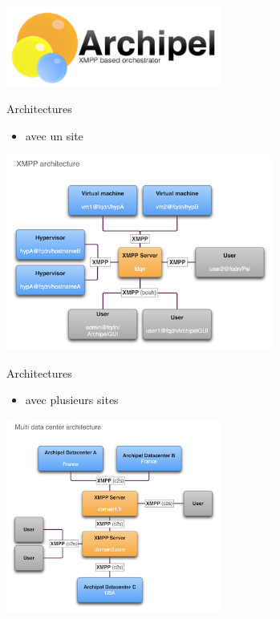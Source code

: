 

%
\begin{frame}
  \begin{center}
   \includegraphics[width=200pt]{images_presentation/logo_archipel.png}
  \end{center}
\end{frame}

\begin{frame}{Architectures}
\begin{itemize}
 \item avec un site
\end{itemize}
\begin{center}
  \includegraphics[width=250pt]{images_presentation/archipel.png}
\end{center}
\end{frame}

\begin{frame}{Architectures}
\begin{itemize}
 \item avec plusieurs sites
\end{itemize}
\begin{center}
\includegraphics[width=200pt]{images_presentation/archipel1.png}
\end{center}
\end{frame}

